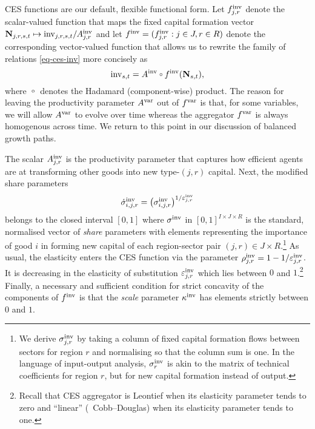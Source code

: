 \documentclass[12pt,a4paper,twoside, draft]{article}
\begin{document}
\begin{remark*}
  CES functions are our default, flexible functional form.
  Let $f_{j, r}^{\textup{inv}}$ denote the scalar-valued
  function that maps the fixed capital formation vector
  $ \mathbf{N}_{j, r, {s}, t} \mapsto
  \textup{inv}_{j, r, {s}, t} / A_{j, r}^{\textup{inv}}$
  and let $f^{\textup{inv}} = (f_{j, r}^{\textup{inv}}: j \in J, r \in R )$
  denote the corresponding vector-valued function that allows us to rewrite
  the family of relations \eqref{eq-ces-inv} more concisely as
  \begin{equation}\label{eq-ces-concise}
  \textup{inv}_{\node, t} = A^{\textup{inv}}
    \ccirc f^{\textup{inv}}(\mathbf{N}_{\node, t}),
  \end{equation}
  where $\ccirc$ denotes the Hadamard (component-wise) product.
  The reason for leaving the productivity parameter $A^{\textup{var}}$ out of
  $f^{\textup{var}}$ is that, for some variables, we will allow
  $A^{\textup{var}}$ to evolve over time whereas the aggregator
  $f^{\textup{var}}$ is always homogenous across time.
  We return to this point in our discussion of balanced growth paths.
\end{remark*}
The scalar $A_{j, r}^{\textup{inv}}$ is the productivity parameter that captures
how efficient agents are at transforming other goods into new type-$(j,r)$
capital.
Next, the modified share parameters
\[
  \acute \sigma_{i,j, r}^{\textup{inv}}
  = \left( \sigma_{i,j, r}^{\textup{inv}} \right)
    ^ {1 / \varepsilon_{j, r}^{\textup{inv}}}
\]
belongs to the closed interval $[0, 1]$ where
$\sigma^{\textup{inv}}$ in $[0, 1]^{I \times J \times R}$ is the standard,
normalised vector of \emph{share} parameters with elements representing the
importance of good $i$ in forming new capital of each region-sector pair
$(j, r) \in J \times R$.\footnote{
  We derive $\sigma_{j, r}^{\textup{inv}}$ by taking a column of fixed capital
  formation flows between sectors for region $r$ and normalising so that the
  column sum is one.
  In the language of input-output analysis, $\sigma_{r}^{\textup{inv}}$ is akin
  to the matrix of technical coefficients for region $r$, but for new capital
  formation instead of output.
}
As usual, the elasticity enters the CES function via the parameter
$\rho_{j, r}^{\textup{inv}} = 1 - 1 / \varepsilon_{j, r}^{\textup{inv}}$.
It is decreasing in the elasticity of substitution
$\varepsilon_{j, r}^{\textup{inv}}$ which lies between $0$ and $1$.\footnote{
  Recall that CES aggregator is Leontief when its elasticity
  parameter tends to zero and ``linear'' (\ie\ Cobb--Douglas) when its
  elasticity parameter tends to one.
}
Finally, a necessary and sufficient condition
\citep[Theorem 2]{Kojic-Concavity} for strict concavity of the
components of $f^{\textup{inv}}$ is that the \emph{scale} parameter
$\kappa^\textup{inv}$ has elements strictly between $0$ and $1$.
\end{document}
